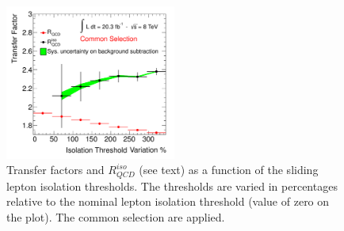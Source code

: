 \begin{figure}[p]
	\begin{center}
	\includegraphics[width=0.50\textwidth]{figure/systematics/QCD_presel_SYS.pdf}
	\end{center}
	\caption{Transfer factors \rqcd and $R_{QCD}^{iso}$  (see text) as a function of the sliding lepton isolation 
	thresholds. The thresholds are varied in percentages relative to the nominal lepton isolation threshold (value of zero on the plot).
	The common selection are applied.
	 }
	\label{fig:os_ss_ratio}
\end{figure}

